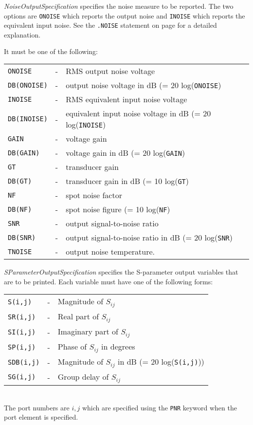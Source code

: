 \begin{widelist}
\item[{\it NoiseOutputSpecification}]
     specifies the noise measure to be reported. The two options are
     {\tt ONOISE} which reports the output noise and
     {\tt INOISE} which reports the equivalent input noise.
     See the {\tt .NOISE} statement on page \pageref{.NOISEstatement}
     for a detailed explanation.

     It  must be one of the following:\\
      \offset\begin{tabular}{lcp{3.5in}}
      {\tt ONOISE} &-&RMS output noise voltage\\
      {\tt DB(ONOISE)} &-&output noise voltage in dB (= 20 log({\tt ONOISE})\\
      {\tt INOISE} &-&RMS equivalent input noise voltage\\
      {\tt DB(INOISE)} &-&equivalent input noise voltage in dB (= 20 log({\tt INOISE})\\
      {\tt GAIN} &-&voltage gain\\
      {\tt DB(GAIN)} &-&voltage gain in dB (= 20 log({\tt GAIN})\\
      {\tt GT} &-&transducer gain\\
      {\tt DB(GT)} &-&transducer gain in dB (= 10 log({\tt GT})\\
      {\tt NF} &-&spot noise factor\\
      {\tt DB(NF)} &-& spot noise figure (= 10 log({\tt NF})\\
      {\tt SNR} &-&output signal-to-noise ratio\\
      {\tt DB(SNR)} &-&output signal-to-noise ratio in dB (= 20 log({\tt SNR})\\
      {\tt TNOISE} &-&output noise temperature.
      \end{tabular}

\item[{\it SParameterOutputSpecification}]
      specifies the S-parameter output variables that are to be printed.
      Each variable must have one of the following forms:\\
      \offset\begin{tabular}{lcp{3.5in}}
      {\tt S(i,j)} &-&Magnitude of $S_{ij}$\\
      {\tt SR(i,j)} &-&Real part of $S_{ij}$\\
      {\tt SI(i,j)} &-&Imaginary part of $S_{ij}$\\
      {\tt SP(i,j)} &-&Phase of $S_{ij}$ in degrees\\
      {\tt SDB(i,j)} &-&Magnitude of $S_{ij}$ in dB
                         (= 20 log({\tt {\tt S(i,j)}}))\\
      {\tt SG(i,j)} &-&Group delay of $S_{ij}$
      \end{tabular}\\[0.1in]
      The port numbers are $i,j$  which are specified using the {\tt PNR} keyword
      when the port element is specified.

\end{widelist}

